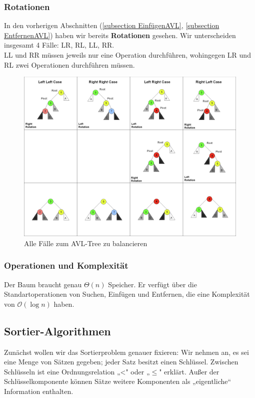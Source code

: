 \documentclass[a4paper]{article}
\begin{document}
\newpage


\subsubsection{Rotationen} \label{Rotationsabschnitt}
In den vorherigen Abschnitten (\ref{subsection EinfügenAVL}, \ref{subsection EntfernenAVL}) haben wir bereits \textbf{Rotationen} gesehen. Wir unterscheiden insgesamt 4 Fälle: LR, RL, LL, RR. \\
LL und RR müssen jeweils nur eine Operation durchführen, wohingegen LR und RL zwei Operationen durchführen müssen. 

\begin{figure}[h]
    \centering
    \includegraphics[scale = 0.4]{Pictures/AVL-Rotations.png}
    \caption{Alle Fälle zum AVL-Tree zu balancieren}
    \label{fig:AVL-rotations}
\end{figure}

\subsubsection{Operationen und Komplexität}
    Der Baum braucht genau $\Theta (n)$ Speicher. Er verfügt über die Standartoperationen von Suchen, Einfügen und Entfernen, die eine Komplexität von $\mathcal{O}(\log n)$ haben. 


\subsection{Sortier-Algorithmen}
Zunächst wollen wir das Sortierproblem genauer fixieren: Wir nehmen an, es sei eine
Menge von Sätzen gegeben; jeder Satz besitzt einen Schlüssel. Zwischen Schlüsseln ist
eine Ordnungsrelation „<" oder „$\leq$" erklärt. Außer der Schlüsselkomponente können
Sätze weitere Komponenten als „eigentliche“ Information enthalten.
\end{document}
